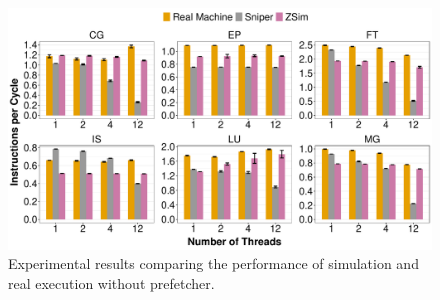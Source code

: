\documentclass[AMA,final,STIX1COL]{WileyNJD-v2}
\begin{document}

\begin{figure}[b]
    \centering
    \includegraphics[width=\linewidth]{figures/fig8.pdf}
    \caption{Experimental results comparing the performance of simulation and real execution without prefetcher.}
    \label{fig:sims_nopref}
\end{figure}


\end{document}
